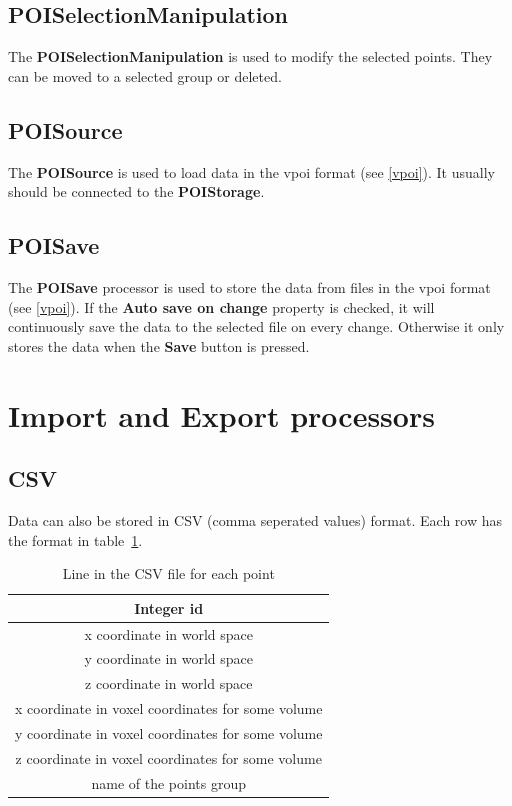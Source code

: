\documentclass[
    fontsize=12pt,
    paper=a4,
    pagesize=auto,
    parskip=false,
    titlepage=on,
    english
]{scrartcl}
\begin{document}
\subsection{POISelectionManipulation}
The \textbf{POISelectionManipulation} is used to modify the selected points. They can be moved to a selected group or deleted.

\subsection{POISource}
The \textbf{POISource} is used to load data in the vpoi format (see \ref{vpoi}). It usually should be connected to the \textbf{POIStorage}.

\subsection{POISave}
The \textbf{POISave} processor is used to store the data from files in the vpoi format (see \ref{vpoi}). If the \textbf{Auto save on change} property is checked, it will continuously save the data to the selected file on every change. Otherwise it only stores the data when the \textbf{Save} button is pressed.

\section{Import and Export processors}
\subsection{CSV}
Data can also be stored in CSV (comma seperated values) format. Each row has the format in table~\ref{tab:csv-format}.

\begin{table}[H]
\center

\begin{tabular}{|c|}
\hline 
Integer id \\ 
\hline 
x coordinate in world space \\ 
\hline 
y coordinate in world space \\ 
\hline 
z coordinate in world space \\ 
\hline 
x coordinate in voxel coordinates for some volume \\ 
\hline 
y coordinate in voxel coordinates for some volume \\ 
\hline 
z coordinate in voxel coordinates for some volume \\ 
\hline 
name of the points group \\ 
\hline 
\end{tabular} 
\caption{Line in the CSV file for each point}
\label{tab:csv-format}
\end{table}
\end{document}
